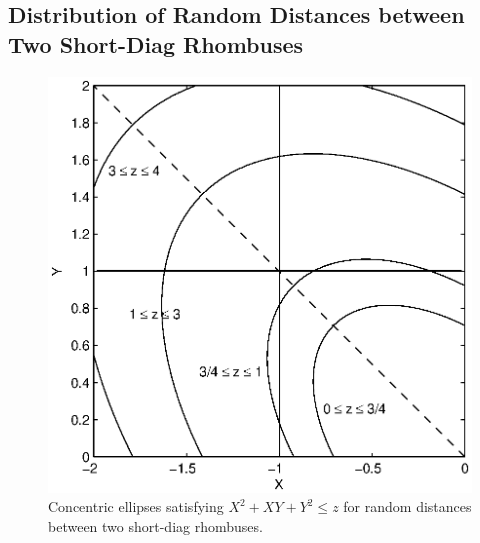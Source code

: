 \documentclass[12pt,draftclsnofoot,onecolumn]{IEEEtran}
\begin{document}
\subsection{Distribution of Random Distances between Two Short-Diag Rhombuses}

\begin{figure}
  \centering
  \includegraphics[width=0.5\columnwidth]{fig/rhombus_diag2}
  \caption{Concentric ellipses satisfying $X^2+XY+Y^2 \leq z$ for random distances between two short-diag rhombuses.}
  \label{fig:diag2}
\end{figure}
\end{document}

